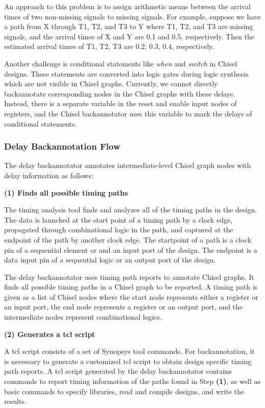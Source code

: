 An approach to this problem is to assign arithmetic means between the arrival times of two non-missing signals to missing signals. For example, suppose we have a path from X through T1, T2, and T3 to Y where T1, T2, and T3 are missing signals, and the arrival times of X and Y are 0.1 and 0.5, respectively. Then the estimated arrival times of T1, T2, T3 are 0.2, 0.3, 0.4, respectively.

Another challenge is conditional statements like \emph{when} and \emph{switch} in Chisel designs. These statements are converted into logic gates during logic synthesis which are not visible in Chisel graphs. Currently, we cannot directly backannotate corresponding nodes in the Chisel graphs with these delays. Instead, there is a separate variable in the reset and enable input nodes of registers, and the Chisel backannotator uses this variable to mark the delays of conditional statements.

\subsubsection{Delay Backannotation Flow}
The delay backannotator annotates intermediate-level Chisel graph nodes with delay information as follows:

{\bf (1) Finds all possible timing paths}
	
The timing analysis tool finds and analyzes all of the timing paths in the design. The data is launched at the start point of a timing path by a clock edge, propagated through combinational logic in the path, and captured at the endpoint of the path by another clock edge. The startpoint of a path is a clock pin of a sequential element or and an input port of the design. The endpoint is a data input pin of a sequential logic or an output port of the design. 

The delay backannotator uses timing path reports to annotate Chisel graphs. It finds all possible timing paths in a Chisel graph to be reported. A timing path is given as a list of Chisel nodes where the start node represents either a register or an input port, the end node represents a register or an output port, and the intermediate nodes represent combinational logics. 

{\bf (2) Generates a tcl script}

A tcl script consists of a set of Synopsys tool commands. For backannotation, it is necessary to generate a customized tcl script to obtain design specific timing path reports. A tcl script generated by the delay backannotator contains commands to report timing information of the paths found in Step {\bf (1)}, as well as basic commands to specify libraries, read and compile designs, and write the results. 

